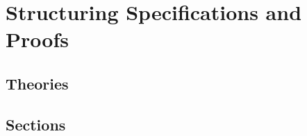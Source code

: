 \chapter{Structuring Specifications and Proofs}
\label{chap:structuring}

\section{Theories}

\section{Sections}
